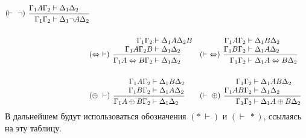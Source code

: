 \documentclass[main]{subfiles}
\begin{document}
\begin{align*}
\begin{prooftree}
           \hypo{\Gamma_1 A\Gamma_2 &\vdash \Delta_1\Delta_2}
           \infer[left label=$(\vdash \ \lnot )$]1{\Gamma_1 \Gamma_2 &\vdash \Delta_1\lnot A\Delta_2}
       \end{prooftree}
    \\
    \\
     & \begin{prooftree}
           \hypo{\Gamma_1 \Gamma_2 &\vdash \Delta_1 A \Delta_2 B}
           \infer[no rule]1{\Gamma_1 A \Gamma_2 B &\vdash \Delta_1 \Delta_2}
           \infer[left label=$(\lra \ \vdash )$]1{\Gamma_1 A\lra B \Gamma_2 &\vdash \Delta_1 \Delta_2}
       \end{prooftree}     &
     & \begin{prooftree}
           \hypo{\Gamma_1 A\Gamma_2 &\vdash \Delta_1 B \Delta_2}
           \infer[no rule]1{\Gamma_1 B \Gamma_2 &\vdash \Delta_1 A \Delta_2}
           \infer[left label=$(\vdash \ \lra)$]1{\Gamma_1 \Gamma_2 &\vdash \Delta_1 A\lra B \Delta_2}
       \end{prooftree}
    \\
    \\
     & \begin{prooftree}
           \hypo{\Gamma_1 A \Gamma_2 &\vdash \Delta_1 B \Delta_2}
           \infer[no rule]1{\Gamma_1 B\Gamma_2  &\vdash \Delta_1 A\Delta_2}
           \infer[left label=$(\oplus \ \vdash )$]1{\Gamma_1 A\oplus B \Gamma_2 &\vdash \Delta_1 \Delta_2}
       \end{prooftree} &
     & \begin{prooftree}
           \hypo{\Gamma_1 \Gamma_2 &\vdash \Delta_1 AB \Delta_2}
           \infer[no rule]1{\Gamma_1 AB \Gamma_2 &\vdash \Delta_1  \Delta_2}
           \infer[left label=$(\vdash \ \oplus)$]1{\Gamma_1 \Gamma_2 &\vdash \Delta_1 A\oplus B \Delta_2}
       \end{prooftree}
\end{align*}
В дальнейшем будут использоваться обозначения $(*\ \vdash)$ и $(\vdash \ *)$, ссылаясь на эту таблицу.
\end{document}
